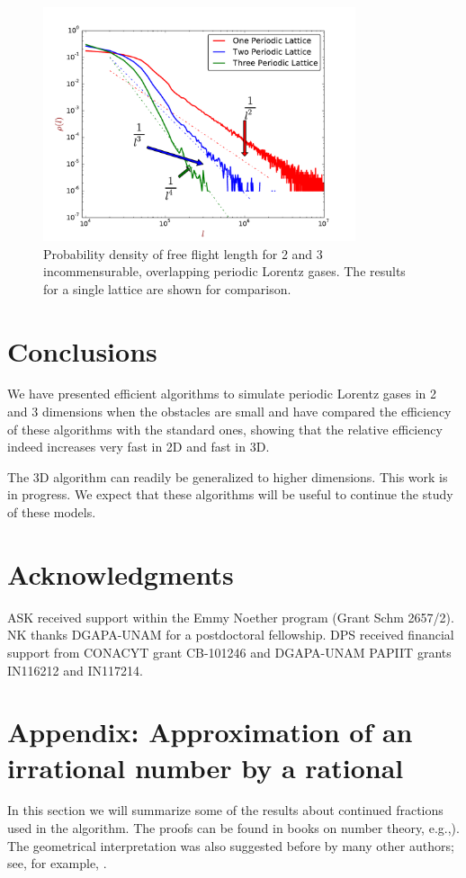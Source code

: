 \documentclass[pre,amsmath,amssymb, twocolumn, showpacs]{revtex4-1}
\begin{document}
\begin{figure}
\centering
\includegraphics [width=260pt]{Free-Fligth-Rot.pdf}
\caption{Probability density of free flight length for 2 and 3 incommensurable, overlapping periodic Lorentz gases. The results for a single lattice are shown for comparison.}
\label{fig:mark}
\end{figure}

\section{Conclusions}  

We have presented efficient algorithms to simulate periodic Lorentz gases in 2 and 3 dimensions when the obstacles are small and have compared the efficiency of these algorithms with the standard ones, showing that the relative efficiency indeed increases very fast in 2D and fast in 3D.

The 3D algorithm can readily be generalized to higher dimensions. This work is in progress.
We expect that these algorithms will be useful to continue the study of these models.

\section{Acknowledgments}  
ASK received support within the Emmy Noether program (Grant Schm
2657/2). NK thanks DGAPA-UNAM for a postdoctoral fellowship. DPS received financial support from CONACYT grant CB-101246 and DGAPA-UNAM PAPIIT grants IN116212 and IN117214. 

\section{Appendix: Approximation of an irrational number by a rational}

In this section we will summarize some of the results about continued fractions used in the algorithm. The proofs can be found in books on number theory, e.g.,\cite{niven2008introduction}). The geometrical interpretation was also suggested before by many other authors; see, for example, \cite{nogueira1995three}. 
\end{document}
